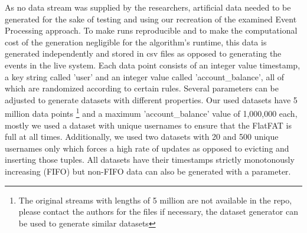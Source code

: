 As no data stream was supplied by the researchers, artificial data needed to be generated
for the sake of testing and using our recreation of the examined Event Processing approach.
To make runs reproducible and to make the computational cost of the generation negligible
for the algorithm's runtime, this data is generated independently and stored in csv files
as opposed to generating the events in the live system.
Each data point consists of an integer value timestamp, a key string called 'user' and
an integer value called 'account\_balance', all of which are randomized according to certain rules.
Several parameters can be adjusted to generate datasets with different properties.
Our used datasets have 5 million data points
\footnote{\noindent The original streams with lengths of 5 million are not available
in the repo, please contact the authors for the files if necessary, the dataset
generator can be used to generate similar datasets}
and a maximum 'account\_balance' value of 1,000,000 each,
mostly we used a dataset with unique usernames to ensure that the FlatFAT is full at all times.
Additionally, we used two datasets with 20 and 500 unique usernames only
which forces a high rate of updates as opposed to evicting and inserting those tuples.
All datasets have their timestamps strictly monotonously increasing (FIFO)
but non-FIFO data can also be generated with a parameter.
